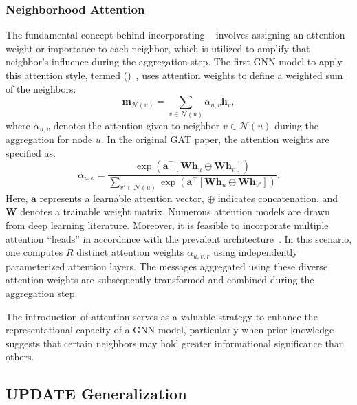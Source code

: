 \subsubsection{Neighborhood Attention}
The fundamental concept behind incorporating ~\cite{Vaswani2017attentionIsAllYouNeed} involves assigning an attention weight or importance to each neighbor, which is utilized to amplify that neighbor's influence during the aggregation step. The first GNN model to apply this attention style, termed  ()~\cite{Velivckovic2017graphAttentionNetworks}, uses attention weights to define a weighted sum of the neighbors:
\begin{equation*}
    \mathbf{m}_{\mathcal{N}(u)} = \sum_{v\in\mathcal{N}(u)} \alpha_{u,v}\mathbf{h}_v,
\end{equation*}
where $ \alpha_{u,v} $ denotes the attention given to neighbor $ v \in \mathcal{N}(u) $ during the aggregation for node $ u $. In the original GAT paper, the attention weights are specified as:
\begin{equation*}
    \alpha_{u,v} = \frac{\exp(\mathbf{a}^\top[\mathbf{W}\mathbf{h}_u \oplus \mathbf{W}\mathbf{h}_v])}{\sum_{v'\in\mathcal{N}(u)} \exp(\mathbf{a}^\top[\mathbf{W}\mathbf{h}_u \oplus \mathbf{W}\mathbf{h}_{v'}])}.
\end{equation*}
Here, $ \mathbf{a} $ represents a learnable attention vector, $ \oplus $ indicates concatenation, and $ \mathbf{W} $ denotes a trainable weight matrix.
Numerous attention models are drawn from deep learning literature. Moreover, it is feasible to incorporate multiple attention “heads” in accordance with the prevalent  architecture~\cite{Vaswani2017attentionIsAllYouNeed}. In this scenario, one computes $ R $ distinct attention weights $ \alpha_{u,v,r} $ using independently parameterized attention layers. The messages aggregated using these diverse attention weights are subsequently transformed and combined during the aggregation step.

The introduction of attention serves as a valuable strategy to enhance the representational capacity of a GNN model, particularly when prior knowledge suggests that certain neighbors may hold greater informational significance than others.

\subsection{UPDATE Generalization}

